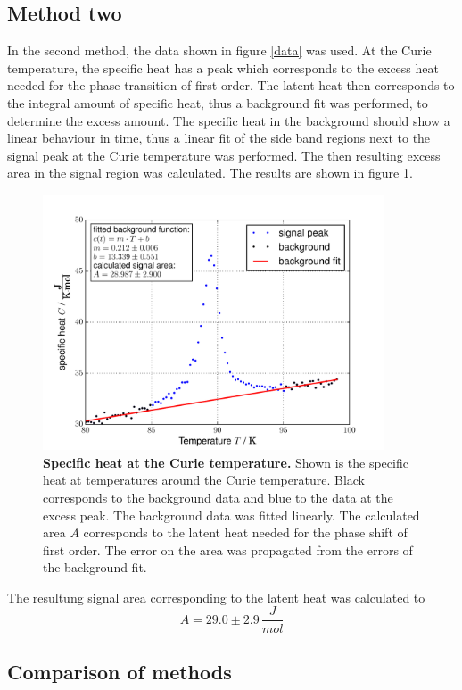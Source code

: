 \documentclass{include/thesisclass3}
\newcommand{\e}[1]{\,\si{#1}}
\begin{document}
\subsection{Method two}
In the second method, the data shown in figure \ref{data} was used. 
At the Curie temperature, the specific heat has a peak which corresponds to the excess heat needed for the phase transition of first order.
The latent heat then corresponds to the integral amount of specific heat, thus a background fit was performed, to determine the excess amount.
The specific heat in the background should show a linear behaviour in time, thus a linear fit of the side band regions next to the signal peak at the Curie temperature was performed.
The then resulting excess area in the signal region was calculated.
The results are shown in figure \ref{area}.
\begin{figure}[H]
\includegraphics[width = 0.9\textwidth]{fig/latentheat_area.pdf}
\caption{\label{area}\textbf{Specific heat at the Curie temperature.} Shown is the specific heat at temperatures around the Curie temperature. Black corresponds to the background data and blue to the data at the excess peak. The background data was fitted linearly. The calculated area $A$ corresponds to the latent heat needed for the phase shift of first order. The error on the area was propagated from the errors of the background fit.}

\end{figure}
The resultung signal area corresponding to the latent heat was calculated to
\[ A = 29.0 \pm 2.9 \e{\frac{J}{mol}}\]

\subsection{Comparison of methods}
\end{document}
